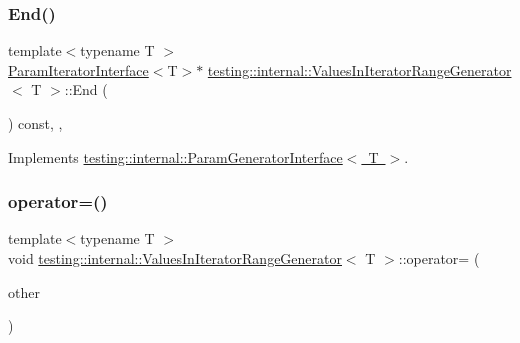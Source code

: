 \subsubsection{\texorpdfstring{End()}{End()}\hspace{0.1cm}{\footnotesize\ttfamily [3/3]}}
{\footnotesize\ttfamily template$<$typename T $>$ \\
\mbox{\hyperlink{classtesting_1_1internal_1_1_param_iterator_interface}{Param\+Iterator\+Interface}}$<$T$>$$\ast$ \mbox{\hyperlink{classtesting_1_1internal_1_1_values_in_iterator_range_generator}{testing\+::internal\+::\+Values\+In\+Iterator\+Range\+Generator}}$<$ T $>$\+::End (\begin{DoxyParamCaption}{ }\end{DoxyParamCaption}) const\hspace{0.3cm}{\ttfamily [inline]}, {\ttfamily [override]}, {\ttfamily [virtual]}}



Implements \mbox{\hyperlink{classtesting_1_1internal_1_1_param_generator_interface_afa7211b74990e11d3fc7ad4e7113da4f}{testing\+::internal\+::\+Param\+Generator\+Interface$<$ T $>$}}.

\mbox{\label{classtesting_1_1internal_1_1_values_in_iterator_range_generator_ab43e1feff118f5be232ae1b85d539dd1}} 
\subsubsection{\texorpdfstring{operator=()}{operator=()}\hspace{0.1cm}{\footnotesize\ttfamily [1/3]}}
{\footnotesize\ttfamily template$<$typename T $>$ \\
void \mbox{\hyperlink{classtesting_1_1internal_1_1_values_in_iterator_range_generator}{testing\+::internal\+::\+Values\+In\+Iterator\+Range\+Generator}}$<$ T $>$\+::operator= (\begin{DoxyParamCaption}\item[{const \mbox{\hyperlink{classtesting_1_1internal_1_1_values_in_iterator_range_generator}{Values\+In\+Iterator\+Range\+Generator}}$<$ T $>$ \&}]{other }\end{DoxyParamCaption})\hspace{0.3cm}{\ttfamily [private]}}

